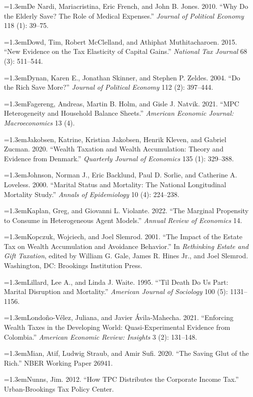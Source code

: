 \documentclass[10pt,twocolumn]{article}
\newcommand{\bibentry}{\par\hangindent=1.3em\noindent}
\begin{document}
{\bibentry De Nardi, Mariacristina, Eric French, and John B. Jones. 2010.
``Why Do the Elderly Save? The Role of Medical Expenses.'' \emph{Journal of
Political Economy} 118 (1): 39--75.

\bibentry Dowd, Tim, Robert McClelland, and Athiphat Muthitacharoen. 2015.
``New Evidence on the Tax Elasticity of Capital Gains.'' \emph{National Tax
Journal} 68 (3): 511--544.

\bibentry Dynan, Karen E., Jonathan Skinner, and Stephen P. Zeldes. 2004.
``Do the Rich Save More?'' \emph{Journal of Political Economy} 112 (2):
397--444.

\bibentry Fagereng, Andreas, Martin B. Holm, and Gisle J. Natvik. 2021.
``MPC Heterogeneity and Household Balance Sheets.'' \emph{American Economic
Journal: Macroeconomics} 13 (4).

\bibentry Jakobsen, Katrine, Kristian Jakobsen, Henrik Kleven, and Gabriel
Zucman. 2020. ``Wealth Taxation and Wealth Accumulation: Theory and Evidence
from Denmark.'' \emph{Quarterly Journal of Economics} 135 (1): 329--388.

\bibentry Johnson, Norman J., Eric Backlund, Paul D. Sorlie, and Catherine A.
Loveless. 2000. ``Marital Status and Mortality: The National Longitudinal
Mortality Study.'' \emph{Annals of Epidemiology} 10 (4): 224--238.

\bibentry Kaplan, Greg, and Giovanni L. Violante. 2022. ``The Marginal
Propensity to Consume in Heterogeneous Agent Models.'' \emph{Annual Review of
Economics} 14.

\bibentry Kopczuk, Wojciech, and Joel Slemrod. 2001. ``The Impact of the
Estate Tax on Wealth Accumulation and Avoidance Behavior.'' In
\emph{Rethinking Estate and Gift Taxation}, edited by William G. Gale, James
R. Hines Jr., and Joel Slemrod. Washington, DC: Brookings Institution Press.

\bibentry Lillard, Lee A., and Linda J. Waite. 1995. ``'Til Death Do Us Part:
Marital Disruption and Mortality.'' \emph{American Journal of Sociology} 100
(5): 1131--1156.

\bibentry Londo\~no-V\'elez, Juliana, and Javier \'Avila-Mahecha. 2021.
``Enforcing Wealth Taxes in the Developing World: Quasi-Experimental Evidence
from Colombia.'' \emph{American Economic Review: Insights} 3 (2): 131--148.

\bibentry Mian, Atif, Ludwig Straub, and Amir Sufi. 2020. ``The Saving Glut
of the Rich.'' NBER Working Paper 26941.

\bibentry Nunns, Jim. 2012. ``How TPC Distributes the Corporate Income Tax.''
Urban-Brookings Tax Policy Center.

}
\end{document}
